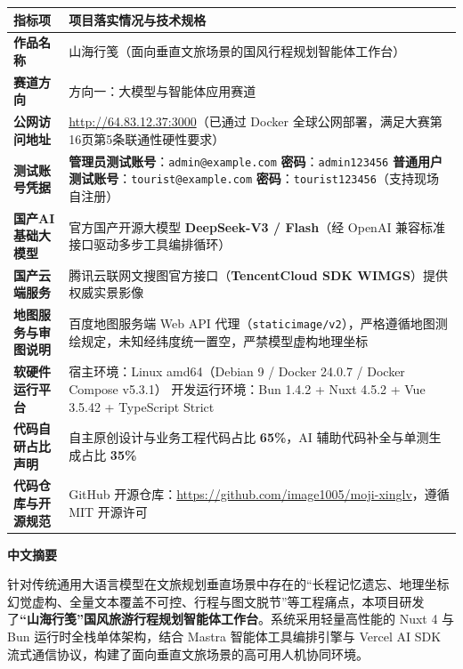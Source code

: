 \documentclass[11pt,a4paper,UTF8]{ctexart}
\begin{document}
\begin{table}[htbp]
\centering
\small
\begin{tabularx}{\textwidth}{p{3.2cm}X}
\toprule
\textbf{指标项} & \textbf{项目落实情况与技术规格} \\
\midrule
\textbf{作品名称} & 山海行笺（面向垂直文旅场景的国风行程规划智能体工作台） \\
\textbf{赛道方向} & 方向一：大模型与智能体应用赛道 \\
\textbf{公网访问地址} & \url{http://64.83.12.37:3000}（已通过 Docker 全球公网部署，满足大赛第16页第5条联通性硬性要求） \\
\textbf{测试账号凭据} & \textbf{管理员测试账号}：\texttt{admin@example.com} \quad \textbf{密码}：\texttt{admin123456} \newline
\textbf{普通用户测试账号}：\texttt{tourist@example.com} \quad \textbf{密码}：\texttt{tourist123456}（支持现场自注册） \\
\textbf{国产AI基础大模型} & 官方国产开源大模型 \textbf{DeepSeek-V3 / Flash}（经 OpenAI 兼容标准接口驱动多步工具编排循环） \\
\textbf{国产云端服务} & 腾讯云联网文搜图官方接口（\textbf{TencentCloud SDK WIMGS}）提供权威实景影像 \\
\textbf{地图服务与审图说明} & 百度地图服务端 Web API 代理（\texttt{staticimage/v2}），严格遵循地图测绘规定，未知经纬度统一置空，严禁模型虚构地理坐标 \\
\textbf{软硬件运行平台} & 宿主环境：Linux amd64（Debian 9 / Docker 24.0.7 / Docker Compose v5.3.1）\newline
开发运行环境：Bun 1.4.2 + Nuxt 4.5.2 + Vue 3.5.42 + TypeScript Strict \\
\textbf{代码自研占比声明} & 自主原创设计与业务工程代码占比 \textbf{65\%}，AI 辅助代码补全与单测生成占比 \textbf{35\%} \\
\textbf{代码仓库与开源规范} & GitHub 开源仓库：\url{https://github.com/image1005/moji-xinglv}，遵循 MIT 开源许可 \\
\bottomrule
\end{tabularx}
\end{table}

\vspace{1.5em}
\begin{center}
    {\large \bfseries 中文摘要}
\end{center}

针对传统通用大语言模型在文旅规划垂直场景中存在的“长程记忆遗忘、地理坐标幻觉虚构、全量文本覆盖不可控、行程与图文脱节”等工程痛点，本项目研发了\textbf{“山海行笺”国风旅游行程规划智能体工作台}。系统采用轻量高性能的 Nuxt 4 与 Bun 运行时全栈单体架构，结合 Mastra 智能体工具编排引擎与 Vercel AI SDK 流式通信协议，构建了面向垂直文旅场景的高可用人机协同环境。
\end{document}
